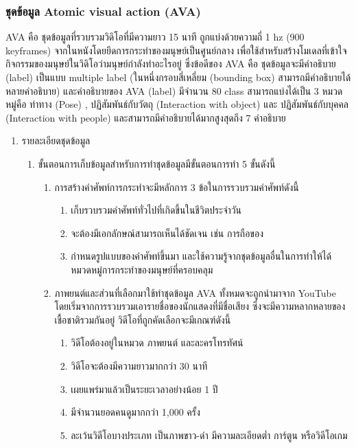 \subsubsection*{ชุดข้อมูล Atomic visual action (AVA)}	
	AVA คือ ชุดข้อมูลที่รวบรวมวิดิโอที่มีความยาว 15 นาที ถูกแบ่งด้วยความถี่ 1 hz (900 keyframes) จากในหนังโดยยึดการกระทำของมนุษย์เป็นศูนย์กลาง เพื่อใช้สำหรับสร้างโมเดลที่เข้าใจกิจกรรมของมนุษย์ในวิดิโอว่ามนุษย์กำลังทำอะไรอยู่ ซึ่งข้อดีของ AVA คือ ชุดข้อมูลจะมีคำอธิบาย (label) เป็นแบบ multiple label (ในหนึ่งกรอบสี่เหลี่ยม (bounding box) สามารถมีคำอธิบายได้หลายคำอธิบาย) และคำอธิบายของ AVA (label) มีจำนวน 80 class สามารถแบ่งได้เป็น 3 หมวดหมู่คือ ท่าทาง (Pose) , ปฏิสัมพันธ์กับวัตถุ (Interaction with object) และ ปฏิสัมพันธ์กับบุคคล (Interaction with people) และสามารถมีคำอธิบายได้มากสูงสุดถึง 7 คำอธิบาย
\begin{enumerate}
	\item {รายละเอียดชุดข้อมูล}
	\begin{enumerate}
		\item ขั้นตอนการเก็บข้อมูลสำหรับการทำชุดข้อมูลมีขั้นตอนการทำ 5 ขั้นดังนี้
		\begin{enumerate}
			\item การสร้างคำศัพท์การกระทำจะมีหลักการ 3 ข้อในการรวบรวมคำศัพท์ดังนี้
			\begin{enumerate}
				\item เก็บรวบรวมคำศัพท์ทั่วไปที่เกิดขึ้นในชีวิตประจำวัน
				\item จะต้องมีเอกลักษณ์สามารถเห็นได้ชัดเจน เช่น การถือของ
				\item กำหนดรูปแบบของคำศัพท์ขึ้นมา และใช้ความรู้จากชุดข้อมูลอื่นในการทำให้ได้หมวดหมู่การกระทำของมนุษย์ที่ครอบคลุม
			\end{enumerate}
			\item ภาพยนต์และส่วนที่เลือกมาใช้ทำชุดข้อมูล AVA ทั้งหมดจะถูกนำมาจาก YouTube โดยเริ่มจากการรวบรวมเอารายชื่อของนักแสดงที่มีชื่อเสียง
			ซึ่งจะมีความหลากหลายของเชื้อชาติรวมกันอยู่ วิดีโอที่ถูกคัดเลือกจะมีเกณฑ์ดังนี้
			\begin{enumerate}
				\item วิดีโอต้องอยู่ในหมวด ภาพยนต์ และละครโทรทัศน์
				\item วิดีโอจะต้องมีความยาวมากกว่า 30 นาที
				\item เผยแพร่มาแล้วเป็นระยะเวลาอย่างน้อย 1 ปี
				\item มีจำนวนยอดคนดูมากกว่า 1,000 ครั้ง
				\item ละเว้นวิดีโอบางประเภท เป็นภาพขาว-ดำ มีความละเอียดต่ำ การ์ตูน หรือวิดีโอเกม
			\end{enumerate}

\end{enumerate}
\end{enumerate}
\end{enumerate}
